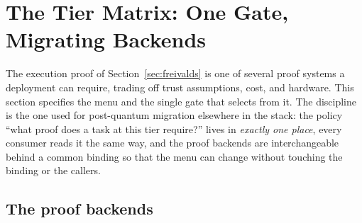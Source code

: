 \section{The Tier Matrix: One Gate, Migrating Backends}
\label{sec:tiers}

The execution proof of Section~\ref{sec:freivalds} is one of several proof systems a
deployment can require, trading off trust assumptions, cost, and hardware. This
section specifies the menu and the single gate that selects from it. The discipline
is the one used for post-quantum migration elsewhere in the stack: the policy ``what
proof does a task at this tier require?'' lives in \emph{exactly one place}, every
consumer reads it the same way, and the proof backends are interchangeable behind a
common binding so that the menu can change without touching the binding or the
callers.

\subsection{The proof backends}

